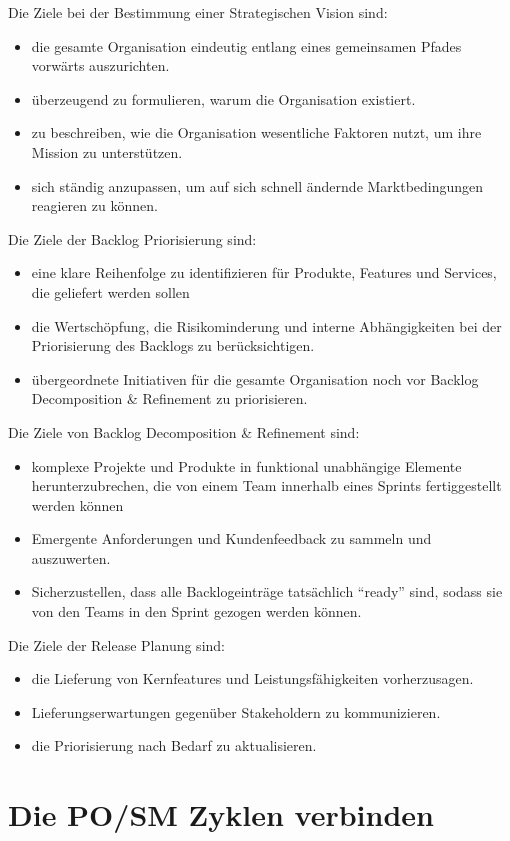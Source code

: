 \documentclass[12pt,a4paper,parskip=full]{scrartcl}
\begin{document}
Die Ziele bei der Bestimmung einer Strategischen Vision sind:
\begin{itemize}
\item die gesamte Organisation eindeutig entlang eines gemeinsamen Pfades vorwärts auszurichten.
\item überzeugend zu formulieren, warum die Organisation existiert.
\item zu beschreiben, wie die Organisation wesentliche Faktoren nutzt, um ihre Mission zu unterstützen.
\item sich ständig anzupassen, um auf sich schnell ändernde Marktbedingungen reagieren zu können.
\end{itemize}
Die Ziele der Backlog Priorisierung sind:
\begin{itemize}
\item eine klare Reihenfolge zu identifizieren für Produkte, Features und
Services, die geliefert werden sollen
\item die Wertschöpfung, die Risikominderung und interne Abhängigkeiten bei der
Priorisierung des Backlogs zu berücksichtigen.
\item übergeordnete Initiativen für die gesamte Organisation noch vor Backlog Decomposition & Refinement zu priorisieren.
\end{itemize}
Die Ziele von Backlog Decomposition \& Refinement sind:
\begin{itemize}
\item komplexe Projekte und Produkte in funktional unabhängige Elemente
herunterzubrechen, die von einem Team innerhalb eines Sprints fertiggestellt
werden können
\item Emergente Anforderungen und Kundenfeedback zu sammeln und auszuwerten.
\item Sicherzustellen, dass alle Backlogeinträge tatsächlich ``ready'' sind,
sodass sie von den Teams in den Sprint gezogen werden können.
\end{itemize}
Die Ziele der Release Planung sind:
\begin{itemize}
\item die Lieferung von Kernfeatures und Leistungsfähigkeiten vorherzusagen.
\item Lieferungserwartungen gegenüber Stakeholdern zu kommunizieren.
\item die Priorisierung nach Bedarf zu aktualisieren.
\end{itemize}

\section{Die PO/SM Zyklen verbinden}
\end{document}
